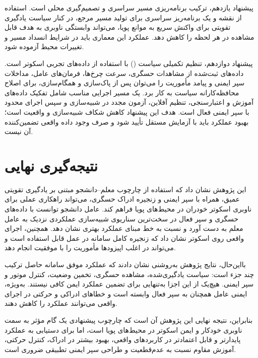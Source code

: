 پیشنهاد یازدهم، ترکیب برنامه‌ریزی مسیر سراسری و تصمیم‌گیری محلی است. استفاده از نقشه و یک برنامه‌ریز سراسری برای تولید مسیر مرجع، در کنار سیاست یادگیری تقویتی برای واکنش سریع به موانع پویا، می‌تواند وابستگی ناوبری به هدف قابل مشاهده در هر لحظه را کاهش دهد. عملکرد این معماری باید در شرایط انسداد مسیر و تغییرات محیط آزموده شود.

پیشنهاد دوازدهم، تنظیم تکمیلی سیاست () با استفاده از داده‌های تجربی اسکوتر است. داده‌های ثبت‌شده از مشاهدات حسگری، سرعت چرخ‌ها، فرمان‌های عامل، مداخلات سپر ایمنی و پیامد مأموریت را می‌توان پس از پاک‌سازی و همگام‌سازی، برای اصلاح محافظه‌کارانه سیاست به کار برد. یک مسیر اجرایی مناسب شامل تفکیک داده‌های آموزش و اعتبارسنجی، تنظیم آفلاین، آزمون مجدد در شبیه‌سازی و سپس اجرای محدود با سپر ایمنی فعال است. هدف این پیشنهاد کاهش شکاف شبیه‌سازی و واقعیت است؛ بهبود عملکرد باید با آزمایش مستقل تأیید شود و صرف وجود داده واقعی تضمین‌کننده آن نیست.

\section{نتیجه‌گیری نهایی}
\label{sec:final_conclusion}

این پژوهش نشان داد که استفاده از چارچوب معلم--دانشجو مبتنی بر یادگیری تقویتی عمیق، همراه با سپر ایمنی و زنجیره ادراک حسگری، می‌تواند راهکاری عملی برای ناوبری اسکوتر خودران در محیط‌های پویا فراهم کند. عامل دانشجو توانست با داده‌های حسگری و سپر فعال در سخت‌ترین سناریوی شبیه‌سازی عملکردی نزدیک به عامل معلم به دست آورد و نسبت به خط مبنای  عملکرد بهتری نشان دهد. همچنین، اجرای واقعی روی اسکوتر نشان داد که زنجیره کامل سامانه در عمل قابل استفاده است و می‌تواند در اغلب اپیزودها مأموریت را با موفقیت انجام دهد.

بااین‌حال، نتایج پژوهش به‌روشنی نشان دادند که عملکرد موفق سامانه حاصل ترکیب چند جزء است: سیاست یادگیری‌شده، مشاهده حسگری، تخمین وضعیت، کنترل موتور و سپر ایمنی. هیچ‌یک از این اجزا به‌تنهایی برای تضمین عملکرد ایمن کافی نیستند. به‌ویژه، ایمنی عامل همچنان به سپر فعال وابسته است و خطاهای ادراکی و حرکتی در اجرای واقعی می‌توانند عملکرد را کاهش دهند.

بنابراین، نتیجه نهایی این پژوهش آن است که چارچوب پیشنهادی یک گام مؤثر به سمت ناوبری خودکار و ایمن اسکوتر در محیط‌های پویا است، اما برای دستیابی به عملکرد پایدارتر و قابل اعتمادتر در کاربردهای واقعی، بهبود بیشتر در ادراک، کنترل حرکتی، آموزش مقاوم نسبت به عدم‌قطعیت و طراحی سپر ایمنی تطبیقی ضروری است.